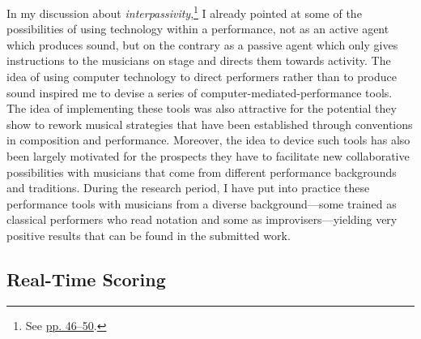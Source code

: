 In my discussion about \emph{interpassivity},\footnote{See \hyperlink{interpassiv}{pp. 46--50}.} I already pointed at some of the possibilities of using technology within a performance, not as an active agent which produces sound, but on the contrary as a passive agent which only gives instructions to the musicians on stage and directs them towards activity. The idea of using computer technology to direct performers rather than to produce sound inspired me to devise a series of computer-mediated-performance tools. The idea of implementing these tools was also attractive for the potential they show to rework musical strategies that have been established through conventions in composition and performance. Moreover, the idea to device such tools has also been largely motivated for the prospects they have to facilitate new collaborative possibilities with musicians that come from different performance backgrounds and traditions. During the research period, I have put into practice these performance tools with musicians from a diverse background---some trained as classical performers who read notation and some as improvisers---yielding very positive results that can be found in the submitted work.

\hypertarget{realtimescore}{}
\subsection{Real-Time Scoring}

